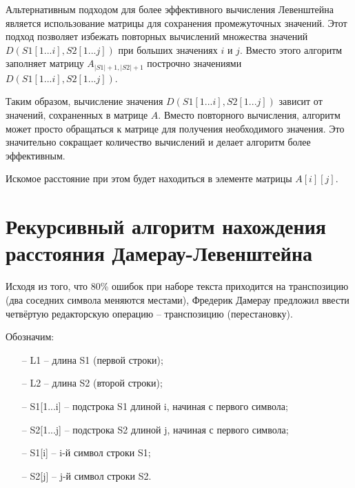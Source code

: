 Альтернативным подходом для более эффективного вычисления Левенштейна является использование матрицы для сохранения промежуточных значений. Этот подход позволяет избежать повторных вычислений множества значений $D(S1[1...i], S2[1...j])$ при больших значениях $i$ и $j$. Вместо этого алгоритм заполняет матрицу $A_{|S1| + 1,|S2| + 1}$ построчно значениями $D(S1[1...i], S2[1...j])$.

Таким образом, вычисление значения $D(S1[1...i], S2[1...j])$ зависит от значений, сохраненных в матрице $A$. Вместо повторного вычисления, алгоритм может просто обращаться к матрице для получения необходимого значения. Это значительно сокращает количество вычислений и делает алгоритм более эффективным.

Искомое расстояние при этом будет находиться в элементе матрицы $A[i][j]$.

\section{Рекурсивный алгоритм нахождения расстояния Дамерау-Левенштейна}

Исходя из того, что 80\% ошибок при наборе текста приходится на транспозицию (два соседних символа меняются местами), Фредерик Дамерау предложил ввести четвёртую редакторскую операцию -- транспозицию (перестановку).

Обозначим:
\begin{itemize}
	\item[--] L1 -- длина S1 (первой строки);
	\item[--] L2 -- длина S2 (второй строки);
	\item[--] S1[1...i] -- подстрока S1 длиной i, начиная с первого символа;
	\item[--] S2[1...j] -- подстрока S2 длиной j, начиная с первого символа;
	\item[--] S1[i] -- i-й символ строки S1;
	\item[--] S2[j] -- j-й символ строки S2.
\end{itemize}


